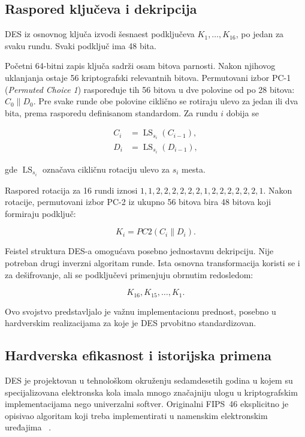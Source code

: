 \subsection{Raspored ključeva i dekripcija}
\label{subsec:des_key_schedule}

DES iz osnovnog ključa izvodi šesnaest podključeva
$K_1,\ldots,K_{16}$, po jedan za svaku rundu. Svaki podključ ima
48 bita.

Početni 64-bitni zapis ključa sadrži osam bitova parnosti. Nakon
njihovog uklanjanja ostaje 56 kriptografski relevantnih bitova.
Permutovani izbor PC-1 (\emph{Permuted Choice 1}) raspoređuje tih
56 bitova u dve polovine od po 28 bitova:
$C_0 \parallel D_0$.
Pre svake runde obe polovine ciklično se rotiraju ulevo za jedan ili
dva bita, prema rasporedu definisanom standardom. Za rundu $i$ dobija
se

\begin{align}
    C_i &= \operatorname{LS}_{s_i}(C_{i-1}),\\
    D_i &= \operatorname{LS}_{s_i}(D_{i-1}),
\end{align}

gde $\operatorname{LS}_{s_i}$ označava cikličnu rotaciju ulevo za
$s_i$ mesta.

Raspored rotacija za 16 rundi iznosi
$1,1,2,2,2,2,2,2,1,2,2,2,2,2,2,1$.
Nakon rotacije, permutovani izbor PC-2 iz ukupno 56 bitova bira 48
bitova koji formiraju podključ:

\begin{equation}
    K_i = PC2(C_i\parallel D_i).
\end{equation}

Feistel struktura DES-a omogućava posebno jednostavnu dekripciju.
Nije potreban drugi inverzni algoritam runde. Ista osnovna
transformacija koristi se i za dešifrovanje, ali se podključevi
primenjuju obrnutim redosledom:

\begin{equation}
    K_{16},K_{15},\ldots,K_1.
\end{equation}

Ovo svojstvo predstavljalo je važnu implementacionu prednost,
posebno u hardverskim realizacijama za koje je DES prvobitno
standardizovan.


\subsection{Hardverska efikasnost i istorijska primena}
\label{subsec:des_hardware}

DES je projektovan u tehnološkom okruženju sedamdesetih godina u
kojem su specijalizovana elektronska kola imala mnogo značajniju ulogu
u kriptografskim implementacijama nego univerzalni softver.
Originalni FIPS~46 eksplicitno je opisivao algoritam koji treba
implementirati u namenskim elektronskim uređajima
~\cite{fips46-1977}.

